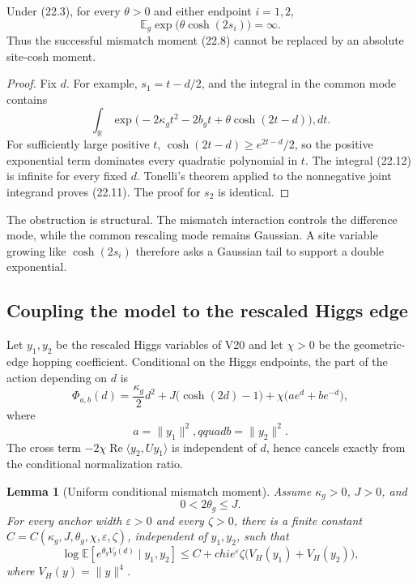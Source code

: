 \documentclass[11pt]{article}
\newtheorem{lemma}[theorem]{Lemma}
\theoremstyle{remark}
\begin{document}
\begin{countertheorem}
\label{ctr:v17v22-common-mode}
Under (22.3), for every \(\theta>0\) and either endpoint \(i=1,2\),
\[
 \mathbb E_g\exp\bigl(\theta\cosh(2s_i)\bigr)
 =\infty.                                          \tag{22.11}
\]
Thus the successful mismatch moment (22.8) cannot be replaced by an
absolute site-cosh moment.
\end{countertheorem}

\begin{proof}
Fix \(d\).  For example, \(s_1=t-d/2\), and the integral in the common
mode contains
\[
 \int_{\mathbb R}
 \exp\bigl(-2\kappa_gt^2-2b_gt
 +\theta\cosh(2t-d)\bigr),dt.                     \tag{22.12}
\]
For sufficiently large positive \(t\),
\(\cosh(2t-d)\geq e^{2t-d}/2\), so the positive exponential term
dominates every quadratic polynomial in \(t\).  The integral (22.12)
is infinite for every fixed \(d\).  Tonelli's theorem applied to the
nonnegative joint integrand proves (22.11).  The proof for \(s_2\) is
identical.
\end{proof}

The obstruction is structural.  The mismatch interaction controls the
difference mode, while the common rescaling mode remains Gaussian.  A
site variable growing like \(\cosh(2s_i)\) therefore asks a Gaussian
tail to support a double exponential.

\subsection{Coupling the model to the rescaled Higgs edge}

Let \(y_1,y_2\) be the rescaled Higgs variables of V20 and let
\(\chi>0\) be the geometric-edge hopping coefficient.  Conditional on
the Higgs endpoints, the part of the action depending on \(d\) is
\[
 \Phi_{a,b}(d)
 =\frac{\kappa_g}{2}d^2+J\bigl(\cosh(2d)-1\bigr)
 +\chi\bigl(ae^d+be^{-d}\bigr),                   \tag{22.13}
\]
where
\[
 a=\|y_1\|^2,qquad b=\|y_2\|^2.                  \tag{22.14}
\]
The cross term
\(-2\chi\operatorname{Re}\langle y_2,Uy_1\rangle\)
is independent of \(d\), hence cancels exactly from the conditional
normalization ratio.

\begin{lemma}[Uniform conditional mismatch moment]
\label{lem:v17v22-reverse}
Assume \(\kappa_g>0\), \(J>0\), and
\[
 0<2\theta_g\leq J.                                \tag{22.15}
\]
For every anchor width \(\varepsilon>0\) and every \(\zeta>0\),
there is a finite constant
\(C=C(\kappa_g,J,\theta_g,\chi,\varepsilon,\zeta)\), independent of
\(y_1,y_2\), such that
\[
 \log\mathbb E\left[
 e^{\theta_gV_g(d)}\mid y_1,y_2\right]
 \leq C+chi e^{\varepsilon}\zeta
 \bigl(V_H(y_1)+V_H(y_2)\bigr),                   \tag{22.16}
\]
where \(V_H(y)=\|y\|^4\).
\end{lemma}
\end{document}
